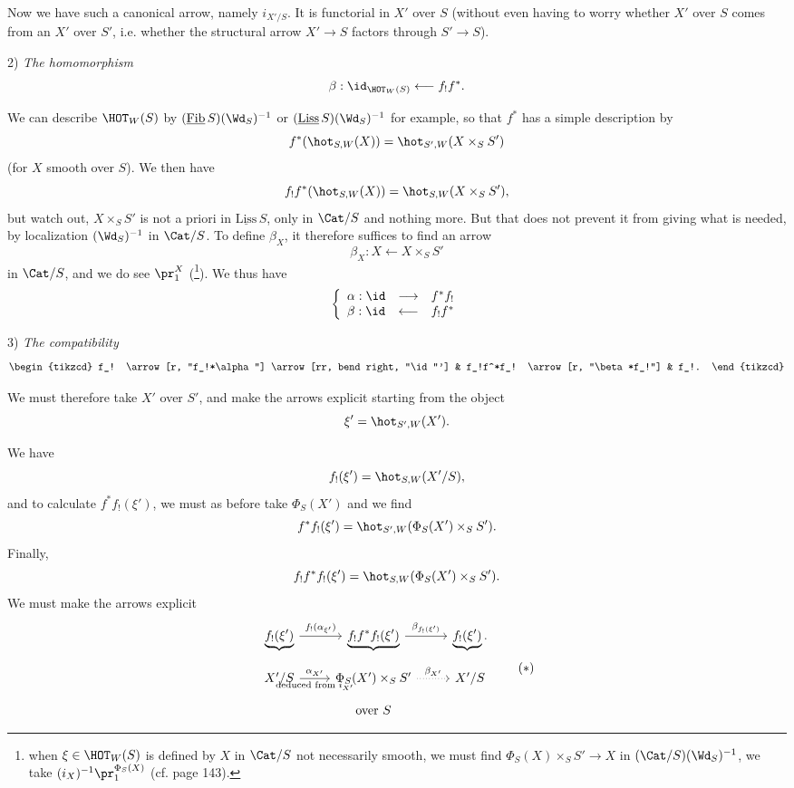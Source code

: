Now we have such a canonical arrow, namely $i_{X'/S}$. It is functorial in $X'$ over $S$ (without even having to worry whether $X'$ over $S$ comes from an $X'$ over $S'$, i.e. whether the structural arrow $X'\longrightarrow S$ factors through $S'\longrightarrow S$).

\leavevmode{}2) \textit{The homomorphism}
\[
\beta : \id_{\HOT_W(S)} \longleftarrow f_!f^*.
\]

We can describe $\HOT_W(S)$ by $(\underline{\mathrm{Fib}}\,S)(\Wd_S)^{-1}$ or $(\underline{\mathrm{Liss}}\,S)(\Wd_S)^{-1}$ for example, so that $f^*$ has a simple description by
\[
f^*(\hot_{S,W}(X)) = \hot_{S',W}(X\times_S S')
\]
(for $X$ smooth over $S$). We then have
\[
f_!f^*(\hot_{S,W}(X)) = \hot_{S,W}(X\times_S S'),
\]
but watch out, $X\times_S S'$ is not a priori in $\underline{\mathrm{Liss}}\,S$, only in $\Cat/S$ and nothing more. But that does not prevent it from giving what is needed, by localization $(\Wd_S)^{-1}$ in $\Cat/S$. To define $\beta_X$, it therefore suffices to find an arrow
\[
\beta_X : X \longleftarrow X\times_S S'
\]
in $\Cat/S$, and we do see $\pr_1^X$ (\footnote[68]{when $\xi\in\HOT_W(S)$ is defined by $X$ in $\Cat/S$ not necessarily smooth, we must find $\Phi_S(X)\times_S S'\longrightarrow X$ in $(\Cat/S)(\Wd_S)^{-1}$, we take $(i_X)^{-1}\pr_1^{\Phi_S(X)}$ (cf. page 143).}). We thus have
\[
\left\{
\begin{array}{lcl}
\alpha : \id & \longrightarrow & f^*f_! \\
\beta : \id & \longleftarrow & f_!f^*
\end{array}
\right.
\]

3) \textit{The compatibility}
\[
\begin{tikzcd}
f_! \arrow[r, "f_!*\alpha"] \arrow[rr, bend right, "\id"'] & f_!f^*f_! \arrow[r, "\beta*f_!"] & f_!.
\end{tikzcd}
\]

We must therefore take $X'$ over $S'$, and make the arrows explicit starting from the object
\[
\xi' = \hot_{S',W}(X').
\]

\leavevmode{}We have
\[
f_!(\xi') = \hot_{S,W}(X'/S),
\]
and to calculate $f^*f_!(\xi')$, we must as before take $\Phi_S(X')$ and we find
\[
f^*f_!(\xi') = \hot_{S',W}(\Phi_S(X')\times_S S').
\]
Finally,
\[
f_!f^*f_!(\xi') = \hot_{S,W}(\Phi_S(X')\times_S S').
\]
We must make the arrows explicit
\[
\begin{tikzcd}[row sep=small]
\underbrace{f_!(\xi')} \arrow[r, "{f_!(\alpha_{\xi'})}"] & \underbrace{f_!f^*f_!(\xi')} \arrow[r, "{\beta_{f_!(\xi')}}"] & \underbrace{f_!(\xi')}. \\
X'/S \arrow[r, "{\alpha_{X'}}", "{\text{deduced from } i_{X'}}"'] & \Phi_S(X')\times_S S' \arrow[r, dotted, "{\beta_{X'}}"] & X'/S \\
 & \text{over } S &
\end{tikzcd}
\tag*{$(*)$}
\]

